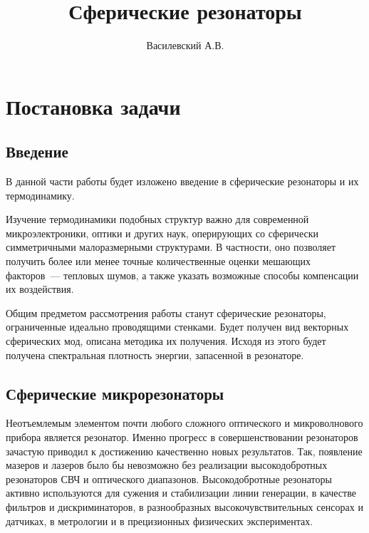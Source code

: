 \documentclass[12pt,a4paper]{article}
\title{Сферические резонаторы}
\author{Василевский А.В.}
\begin{document}
    \maketitle
    \tableofcontents

    \section{Постановка задачи}


    \subsection*{Введение}

        В данной части работы будет изложено введение в сферические резонаторы и их термодинамику.

        Изучение термодинамики подобных структур важно для современной микроэлектроники, оптики и других наук, оперирующих со сферически симметричными малоразмерными структурами. В частности, оно позволяет получить более или менее точные количественные оценки мешающих факторов~--- тепловых шумов, а также указать возможные способы компенсации их воздействия.

        Общим предметом рассмотрения работы станут сферические резонаторы, ограниченные идеально проводящими стенками. Будет получен вид векторных сферических мод, описана методика их получения. Исходя из этого будет получена спектральная плотность энергии, запасенной в резонаторе.


    \subsection{Сферические микрорезонаторы}

        Неотъемлемым элементом почти любого сложного оптического и микроволнового прибора является резонатор. Именно прогресс в совершенствовании резонаторов зачастую приводил к достижению качественно новых результатов. Так, появление мазеров и лазеров было бы невозможно без реализации высокодобротных резонаторов СВЧ и оптического диапазонов. Высокодобротные резонаторы активно используются для сужения и стабилизации линии генерации, в качестве фильтров и дискриминаторов, в разнообразных высокочувствительных сенсорах и датчиках, в метрологии и в прецизионных физических экспериментах. \cite{microresonators}
\end{document}
